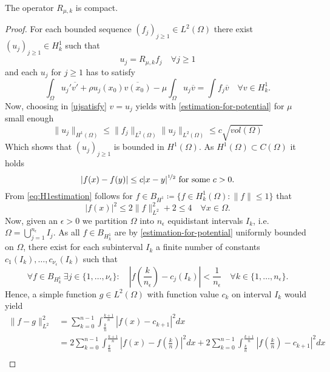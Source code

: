 \begin{theorem} \label{3.1:thm-R_mu,k.isCompact}
	The operator $R_{\mu, k}$ is compact.

	\begin{proof}
	For each bounded sequence $(f_{j})_{j \geq 1} \in L^{2}(\Omega)$ there exist $(u_{j})_{j \geq 1} \in H^{1}_{k}$ such that
		\[ u_{j} = R_{\mu, k} f_{j} \quad \forall j \geq 1 \]
	and each $u_{j}$ for $j \geq 1$ has to satisfy
		\begin{equation}
			\int_{\Omega} u_{j}' \overline{v'} + \rho u_{j}(x_{0}) \overline{v(x_{0})} - \mu \int_{\Omega} u_{j} \overline{v} = \int f_{j} \overline{v} \quad \forall v \in H^{1}_{k}. \label{ujsatisfy}
		\end{equation} 
	Now, choosing in \eqref{ujsatisfy} $v = u_{j}$ yields with \eqref{estimation-for-potential} for $\mu$ small enough
		\[  \| u_{j} \|_{H^{1}(\Omega)} \leq \| f_{j} \|_{L^{2}(\Omega)} \| u_{j} \|_{L^{2}(\Omega)} \leq c \sqrt{vol(\Omega)} \]
	Which shows that $(u_{j})_{j \geq 1}$ is bounded in $H^{1}(\Omega)$. As $H^1(\Omega) \subset C(\Omega)$ it holds
		\begin{equation}
			|f(x) - f(y)| \leq c |x - y|^{\nicefrac{1}{2}} \text{ for some } c > 0. \label{eq:H1estimation}
		\end{equation}  
		From \eqref{eq:H1estimation} follows for $f \in B_{H^{1}} \coloneqq \{ f \in H^{1}_{k}(\Omega) : \| f \| \leq 1 \}$ that 
		\[ |f(x)|^{2} \leq 2 \| f \|^{2}_{L^{2}} + 2 \leq 4 \quad \forall x \in \Omega. \]
		Now, given an $\epsilon > 0$ we partition $\Omega$ into $n_{\epsilon}$ equidistant intervals $I_{k}$, i.e. $\Omega = \bigcup_{j = 1}^{n_{\epsilon}} I_{j}$. As all $f \in B_{H^{1}_{k}}$ are by \eqref{estimation-for-potential} uniformly bounded on $\Omega$, there exist for each subinterval $I_{k}$ a finite number of constants $c_{1}(I_{k}), \dotsc, c_{\nu_{\epsilon}}(I_{k})$ such that 
			$$ \forall f \in B_{H^{1}_{k}} ~\exists j \in \{1, \dotsc, \nu_{\epsilon} \}: \quad |f(\frac{k}{n_{\epsilon}}) - c_{j}(I_{k})| < \frac{1}{n_{\epsilon}} \quad \forall k \in \{ 1 , \dotsc, n_{\epsilon} \}. $$	
		Hence, a simple function $g \in L^{2}(\Omega)$ with function value $c_{k}$ on interval $I_{k}$ would yield
		\begin{align*}
			\| f - g \|^{2}_{L^{2}} & = \sum_{k = 0}^{n-1} \int_{\frac{k}{n}}^{\frac{k+1}{n}} | f(x) - c_{k+1} |^{2} dx \\
				& =  2 \sum_{k = 0}^{n-1} \int_{\frac{k}{n}}^{\frac{k+1}{n}} | f(x) - f(\frac{k}{n}) |^{2} dx +  2 \sum_{k = 0}^{n-1} \int_{\frac{k}{n}}^{\frac{k+1}{n}} | f(\frac{k}{n}) - c_{k+1} |^{2} dx \\

\end{align*}
\end{proof}
\end{theorem}

